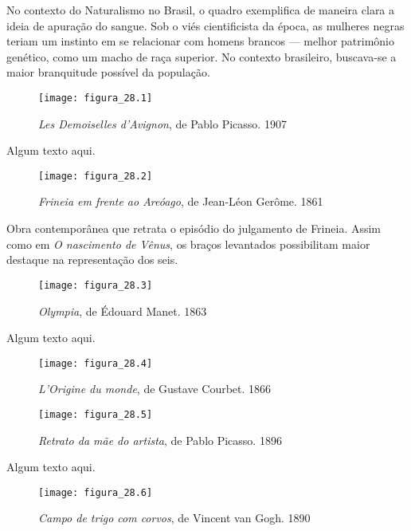 No contexto do Naturalismo no Brasil, o quadro exemplifica de maneira clara a ideia de apuração do sangue. Sob o viés cientificista da época, as mulheres negras teriam um instinto em se relacionar com homens brancos — melhor patrimônio genético, como um macho de raça superior. No contexto brasileiro, buscava-se a maior branquitude possível da população.

\newpage

\begin{figure}[h]
\texttt{[image: figura\_28.1]}
\caption{\textit{Les Demoiselles d'Avignon}, de Pablo Picasso. 1907}
\label{fig:mesh28.1}
\end{figure}

Algum texto aqui.

\newpage

\begin{figure}[h]
\texttt{[image: figura\_28.2]}
\caption{\textit{Frineia em frente ao Areóago}, de Jean-Léon Gerôme. 1861}
\label{fig:mesh28.2}
\end{figure}

Obra contemporânea que retrata o episódio do julgamento de Frineia. Assim como em \textit{O nascimento de Vênus}, os braços levantados possibilitam maior destaque na representação dos seis.

\newpage

\begin{figure}[h]
\texttt{[image: figura\_28.3]}
\caption{\textit{Olympia}, de Édouard Manet. 1863}
\label{fig:mesh28.3}
\end{figure}

Algum texto aqui.

\newpage

\begin{figure}[h]
\texttt{[image: figura\_28.4]}
\caption{\textit{L'Origine du monde}, de Gustave Courbet. 1866}
\label{fig:mesh28.4}
\end{figure}

\newpage

\begin{figure}[h]
\texttt{[image: figura\_28.5]}
\caption{\textit{Retrato da mãe do artista}, de Pablo Picasso. 1896}
\label{fig:mesh28.5}
\end{figure}

Algum texto aqui.

\newpage

\begin{figure}[h]
\texttt{[image: figura\_28.6]}
\caption{\textit{Campo de trigo com corvos}, de Vincent van Gogh. 1890}
\label{fig:mesh28.6}
\end{figure}

